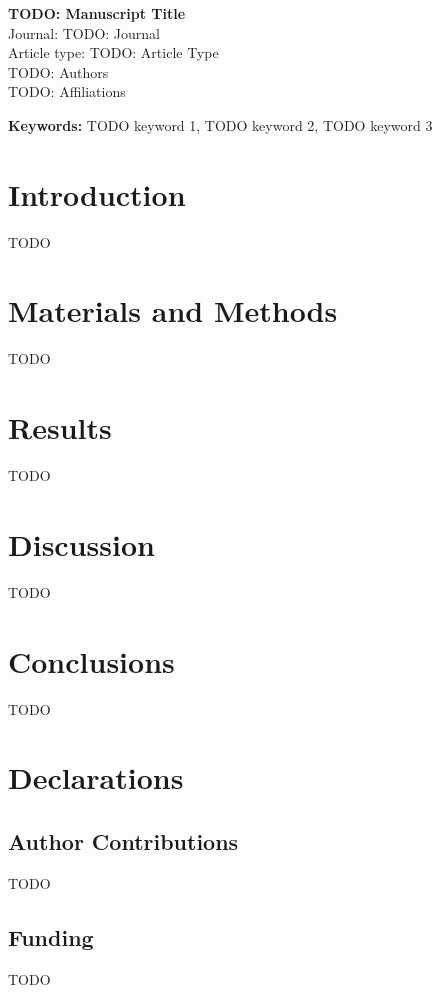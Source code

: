 \documentclass[12pt]{article}
\begin{document}

\begin{titlepage}
\centering
{\LARGE \textbf{TODO: Manuscript Title}\\[1em]}
{\large Journal: TODO: Journal\\}
{\large Article type: TODO: Article Type\\[1em]}
{\large TODO: Authors\\[1em]}
{\normalsize TODO: Affiliations\\}
\vfill
\end{titlepage}

\begin{abstract}
TODO: Abstract
\end{abstract}

\noindent\textbf{Keywords:} TODO keyword 1, TODO keyword 2, TODO keyword 3

\section{Introduction}
TODO

\section{Materials and Methods}
TODO

\section{Results}
TODO

\section{Discussion}
TODO

\section{Conclusions}
TODO

\section*{Declarations}
\subsection*{Author Contributions}
TODO

\subsection*{Funding}
TODO
\end{document}
